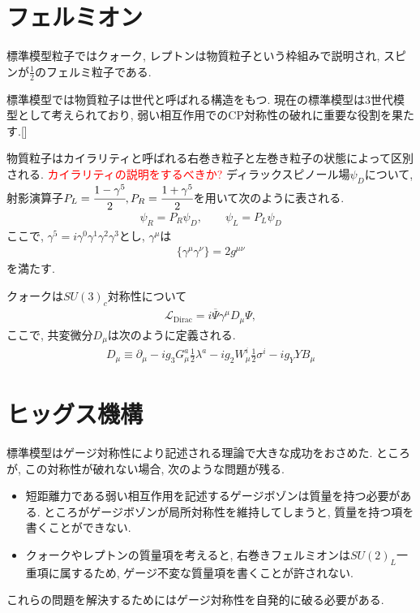 \section{フェルミオン}
標準模型粒子ではクォーク, レプトンは物質粒子という枠組みで説明され, スピンが$\frac{1}{2}$のフェルミ粒子である.

標準模型では物質粒子は世代と呼ばれる構造をもつ.
現在の標準模型は3世代模型として考えられており, 弱い相互作用でのCP対称性の破れに重要な役割を果たす.[]

物質粒子はカイラリティと呼ばれる右巻き粒子と左巻き粒子の状態によって区別される.
\textcolor{red}{カイラリティの説明をするべきか?}
ディラックスピノール場$\psi_D$について, 射影演算子$P_L = \cfrac{1-\gamma^5}{2}, P_R= \cfrac{1+\gamma^5}{2}$を用いて次のように表される.
\begin{align}
  \psi_R = P_R \psi_D,\qquad \psi_L=P_L \psi_D
\end{align}
ここで, $\gamma^5= i\gamma^0 \gamma^1 \gamma^2 \gamma^3$とし, $\gamma^\mu$は
\begin{align}
  \{ \gamma^\mu \gamma^\nu \} = 2g^{\mu\nu}
\end{align}
を満たす.

クォークは$SU(3)_c$対称性について
\begin{align}
  \mathcal{L}_{\mathrm{Dirac}} = i\overline{\Psi}\gamma^\mu D_\mu \Psi,
\end{align}
ここで, 共変微分$D_\mu$は次のように定義される.
\begin{align}
  D_\mu \equiv \partial_\mu -ig_3 G_\mu^a \frac{1}{2}\lambda^a -ig_2 W_\mu^i\frac{1}{2}\sigma^i -ig_Y Y B_\mu
\end{align}

\section{ヒッグス機構}
標準模型はゲージ対称性により記述される理論で大きな成功をおさめた.
ところが, この対称性が破れない場合, 次のような問題が残る.
\begin{itemize}
  \item 短距離力である弱い相互作用を記述するゲージボゾンは質量を持つ必要がある. ところがゲージボゾンが局所対称性を維持してしまうと, 質量を持つ項を書くことができない.
  \item クォークやレプトンの質量項を考えると, 右巻きフェルミオンは$SU(2)_L$一重項に属するため, ゲージ不変な質量項を書くことが許されない.
\end{itemize}
これらの問題を解決するためにはゲージ対称性を自発的に破る必要がある.

